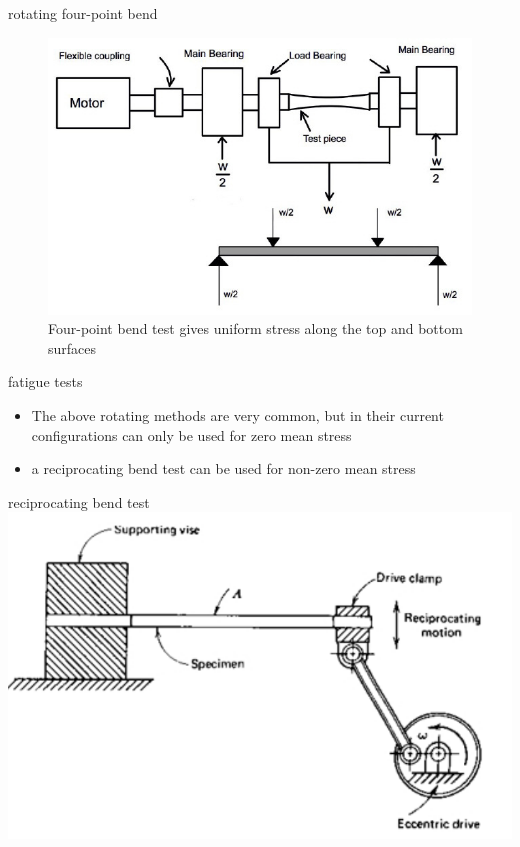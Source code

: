 \documentclass[
  letterpaper,
  ignorenonframetext,
  aspectratio=43,
  handout,
  12pt]{beamer}
\providecommand{\tightlist}{%
  \setlength{\itemsep}{0pt}\setlength{\parskip}{0pt}}
\providecommand{\tightlist}{%
\setlength{\itemsep}{0pt}\setlength{\parskip}{0pt}}
\let\Oldincludegraphics\includegraphics
\renewcommand{\includegraphics}[2][]{\Oldincludegraphics[width=\textwidth,height=0.7\textheight,keepaspectratio]{#2}}
\begin{document}
\begin{frame}{rotating four-point bend}
\protect\hypertarget{rotating-four-point-bend}{}
\begin{figure}
\centering
\includegraphics{../images/Rotating_Bending_Machine.jpg}
\caption{Four-point bend test gives uniform stress along the top and
bottom surfaces}
\end{figure}
\end{frame}

\begin{frame}{fatigue tests}
\protect\hypertarget{fatigue-tests-1}{}
\begin{itemize}
\tightlist
\item
  The above rotating methods are very common, but in their current
  configurations can only be used for zero mean stress
\item
  a reciprocating bend test can be used for non-zero mean stress
\end{itemize}
\end{frame}

\begin{frame}{reciprocating bend test}
\protect\hypertarget{reciprocating-bend-test}{}
\includegraphics{../images/reciprocating_cantilever.PNG}
\end{frame}
\end{document}
